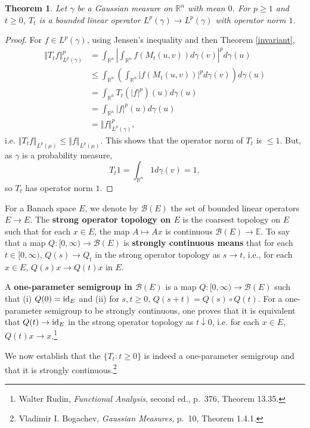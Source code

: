 \documentclass{article}
\newcommand{\id}{\ensuremath\mathrm{id}}
\newcommand{\norm}[1]{\left\Vert #1 \right\Vert}
\newtheorem{theorem}{Theorem}
\theoremstyle{definition}
\begin{document}
\begin{theorem}
Let $\gamma$ be a Gaussian measure on
$\mathbb{R}^n$ with mean $0$.
For $p \geq 1$ and $t \geq 0$, $T_t$ is a bounded linear operator
$L^p(\gamma) \to L^p(\gamma)$ with operator norm $1$.
\label{bounded}
\end{theorem}
\begin{proof}
For $f \in L^p(\gamma)$,
using
Jensen's  inequality and then Theorem \ref{invariant},
\begin{align*}
\norm{T_t f}_{L^p(\gamma)}^p& =
\int_{\mathbb{R}^n} \left| \int_{\mathbb{R}^n} f(M_t(u,v))
d\gamma(v) \right|^p d\gamma(u) \\
&\leq \int_{\mathbb{R}^n} \left( \int_{\mathbb{R}^n} | f(M_t(u,v))|^p d\gamma(v) \right) d\gamma(u)\\
&=\int_{\mathbb{R}^n} T_t(|f|^p)(u) d\gamma(u)\\
&=\int_{\mathbb{R}^n} |f|^p(u) d\gamma(u)\\
&=\norm{f}_{L^p(\gamma)}^p,
\end{align*}
i.e. $\norm{T_t f}_{L^p(\mu)} \leq \norm{f}_{L^p(\mu)}$.
This shows that the operator norm of $T_t$ is $\leq 1$. But, as $\gamma$ is a probability measure,
\[
T_t 1 = \int_{\mathbb{R}^n} 1 d\gamma(v)
=1,
\]
so $T_t$ has operator norm $1$. 
\end{proof}



For a Banach space $E$, we denote by $\mathscr{B}(E)$ the set of bounded linear operators
$E \to E$. The \textbf{strong operator topology on $E$} is the coarsest topology on $E$ such that
for each $x \in E$, the map $A \mapsto Ax$ is continuous $\mathscr{B}(E) \to \mathbb{E}$. 
To say that a map $Q:[0,\infty) \to \mathscr{B}(E)$ is \textbf{strongly continuous means} that
for each $t \in [0,\infty)$,
$Q(s) \to Q_t$ in the strong operator topology as $s \to t$, i.e., for each $x \in E$,
$Q(s) x \to Q(t) x$ in $E$. 

A \textbf{one-parameter semigroup in $\mathscr{B}(E)$} is a map
$Q:[0,\infty) \to \mathscr{B}(E)$ such that (i) $Q(0)=\id_E$ and (ii) for $s,t \geq 0$,
$Q(s+t)=Q(s) \circ Q(t)$. For a one-parameter semigroup to be strongly continuous,
one proves that it is equivalent that 
$Q(t) \to \id_E$ in the strong operator topology as $t \downarrow 0$, i.e. 
for each $x \in E$, $Q(t)x \to x$.\footnote{Walter Rudin, {\em Functional Analysis},
second ed., p.~376, Theorem 13.35.}

We now establish that the $\{T_t:t \geq 0\}$ is indeed a one-parameter semigroup and that it is strongly continuous.\footnote{Vladimir I. Bogachev,
{\em Gaussian Measures}, p.~10, Theorem 1.4.1.}
\end{document}
